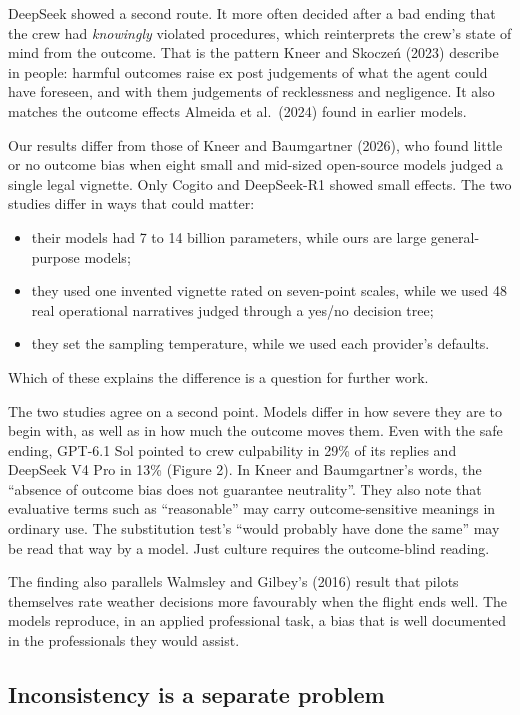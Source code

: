 \documentclass[review,12pt]{elsarticle}
\providecommand{\tightlist}{\setlength{\itemsep}{0pt}\setlength{\parskip}{0pt}}
\begin{document}
DeepSeek showed a second route. It more often decided after a bad ending that the crew had \emph{knowingly} violated procedures, which reinterprets the crew's state of mind from the outcome. That is the pattern Kneer and Skoczeń (2023) describe in people: harmful outcomes raise ex post judgements of what the agent could have foreseen, and with them judgements of recklessness and negligence. It also matches the outcome effects Almeida et al.~(2024) found in earlier models.

Our results differ from those of Kneer and Baumgartner (2026), who found little or no outcome bias when eight small and mid-sized open-source models judged a single legal vignette. Only Cogito and DeepSeek-R1 showed small effects. The two studies differ in ways that could matter:

\begin{itemize}
\tightlist
\item
  their models had 7 to 14 billion parameters, while ours are large general-purpose models;
\item
  they used one invented vignette rated on seven-point scales, while we used 48 real operational narratives judged through a yes/no decision tree;
\item
  they set the sampling temperature, while we used each provider's defaults.
\end{itemize}

Which of these explains the difference is a question for further work.

The two studies agree on a second point. Models differ in how severe they are to begin with, as well as in how much the outcome moves them. Even with the safe ending, GPT-6.1 Sol pointed to crew culpability in 29\% of its replies and DeepSeek V4 Pro in 13\% (Figure 2). In Kneer and Baumgartner's words, the ``absence of outcome bias does not guarantee neutrality''. They also note that evaluative terms such as ``reasonable'' may carry outcome-sensitive meanings in ordinary use. The substitution test's ``would probably have done the same'' may be read that way by a model. Just culture requires the outcome-blind reading.

The finding also parallels Walmsley and Gilbey's (2016) result that pilots themselves rate weather decisions more favourably when the flight ends well. The models reproduce, in an applied professional task, a bias that is well documented in the professionals they would assist.

\hypertarget{inconsistency-is-a-separate-problem}{%
\subsection{Inconsistency is a separate problem}\label{inconsistency-is-a-separate-problem}}
\end{document}
